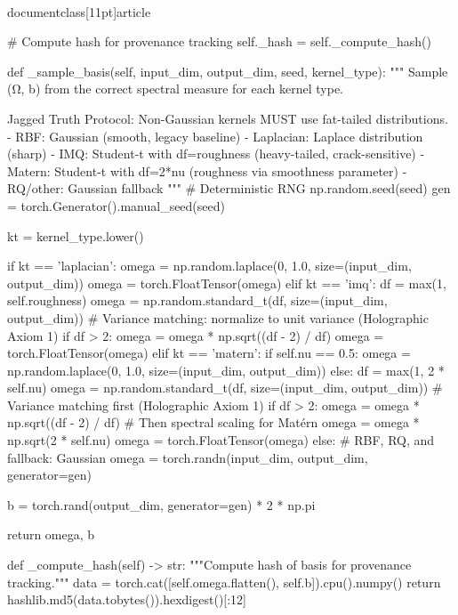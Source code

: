 \\documentclass[11pt]{article}
\begin{document}
\begin{CodeBlock}
        # Compute hash for provenance tracking
        self._hash = self._compute_hash()

    def _sample_basis(self, input_dim, output_dim, seed, kernel_type):
        """
        Sample (Ω, b) from the correct spectral measure for each kernel type.

        Jagged Truth Protocol: Non-Gaussian kernels MUST use fat-tailed distributions.
        - RBF: Gaussian (smooth, legacy baseline)
        - Laplacian: Laplace distribution (sharp)
        - IMQ: Student-t with df=roughness (heavy-tailed, crack-sensitive)
        - Matern: Student-t with df=2*nu (roughness via smoothness parameter)
        - RQ/other: Gaussian fallback
        """
        # Deterministic RNG
        np.random.seed(seed)
        gen = torch.Generator().manual_seed(seed)

        kt = kernel_type.lower()

        if kt == 'laplacian':
            omega = np.random.laplace(0, 1.0, size=(input_dim, output_dim))
            omega = torch.FloatTensor(omega)
        elif kt == 'imq':
            df = max(1, self.roughness)
            omega = np.random.standard_t(df, size=(input_dim, output_dim))
            # Variance matching: normalize to unit variance (Holographic Axiom 1)
            if df > 2:
                omega = omega * np.sqrt((df - 2) / df)
            omega = torch.FloatTensor(omega)
        elif kt == 'matern':
            if self.nu == 0.5:
                omega = np.random.laplace(0, 1.0, size=(input_dim, output_dim))
            else:
                df = max(1, 2 * self.nu)
                omega = np.random.standard_t(df, size=(input_dim, output_dim))
                # Variance matching first (Holographic Axiom 1)
                if df > 2:
                    omega = omega * np.sqrt((df - 2) / df)
                # Then spectral scaling for Matérn
                omega = omega * np.sqrt(2 * self.nu)
            omega = torch.FloatTensor(omega)
        else:
            # RBF, RQ, and fallback: Gaussian
            omega = torch.randn(input_dim, output_dim, generator=gen)

        b = torch.rand(output_dim, generator=gen) * 2 * np.pi

        return omega, b

    def _compute_hash(self) -> str:
        """Compute hash of basis for provenance tracking."""
        data = torch.cat([self.omega.flatten(), self.b]).cpu().numpy()
        return hashlib.md5(data.tobytes()).hexdigest()[:12]
    

\end{CodeBlock}
\end{document}
